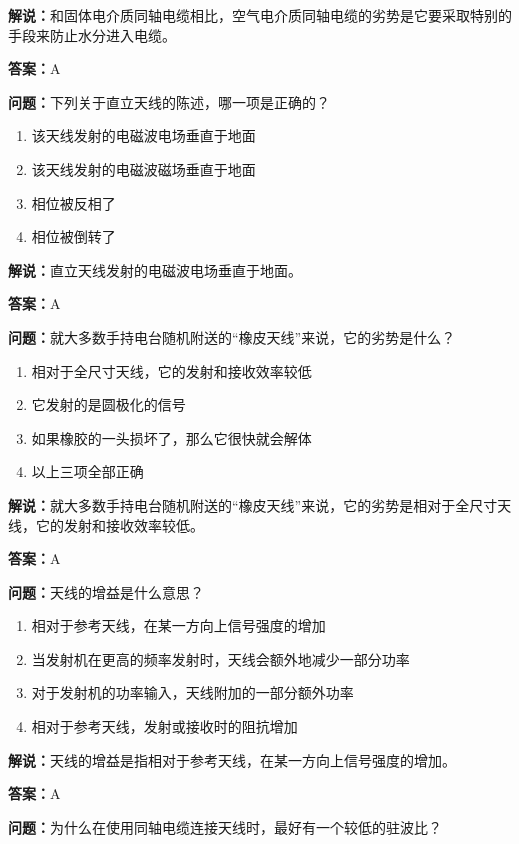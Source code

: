 \documentclass[UTF8]{ctexbook}
\begin{document}
\textbf{解说：}和固体电介质同轴电缆相比，空气电介质同轴电缆的劣势是它要采取特别的手段来防止水分进入电缆。%

\textbf{答案：}A

\textbf{问题：}下列关于直立天线的陈述，哪一项是正确的？

\begin{enumerate}[label=\Alph*), leftmargin=3em]
  \item 该天线发射的电磁波电场垂直于地面
  \item 该天线发射的电磁波磁场垂直于地面
  \item 相位被反相了
  \item 相位被倒转了
\end{enumerate}

\textbf{解说：}直立天线发射的电磁波电场垂直于地面。%

\textbf{答案：}A

\textbf{问题：}就大多数手持电台随机附送的“橡皮天线”来说，它的劣势是什么？

\begin{enumerate}[label=\Alph*), leftmargin=3em]
  \item 相对于全尺寸天线，它的发射和接收效率较低
  \item 它发射的是圆极化的信号
  \item 如果橡胶的一头损坏了，那么它很快就会解体
  \item 以上三项全部正确
\end{enumerate}

\textbf{解说：}就大多数手持电台随机附送的“橡皮天线”来说，它的劣势是相对于全尺寸天线，它的发射和接收效率较低。%

\textbf{答案：}A

\textbf{问题：}天线的增益是什么意思？

\begin{enumerate}[label=\Alph*), leftmargin=3em]
  \item 相对于参考天线，在某一方向上信号强度的增加
  \item 当发射机在更高的频率发射时，天线会额外地减少一部分功率
  \item 对于发射机的功率输入，天线附加的一部分额外功率
  \item 相对于参考天线，发射或接收时的阻抗增加
\end{enumerate}

\textbf{解说：}天线的增益是指相对于参考天线，在某一方向上信号强度的增加。%

\textbf{答案：}A

\textbf{问题：}为什么在使用同轴电缆连接天线时，最好有一个较低的驻波比？
\end{document}
